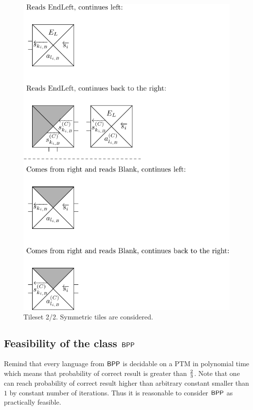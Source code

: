 	\begin{figure}[h]
	\begin{center}
		\includegraphics{./figures/tiles2.pdf}
		\caption{Tileset 2/2. Symmetric tiles are considered.}
		\label{fig:tileset2}
	\end{center}
	\end{figure}

\subsection{Feasibility of the class $\mathsf{BPP}$}
	
	Remind that every language from $\mathsf{BPP}$ is decidable on a PTM in polynomial time which means that probability of correct result is greater than $\nicefrac{2}{3}$. Note that one can reach probability of correct result higher than arbitrary constant smaller than $1$ by constant number of iterations. Thus it is reasonable to consider $\mathsf{BPP}$ as practically feasible.   %
	

